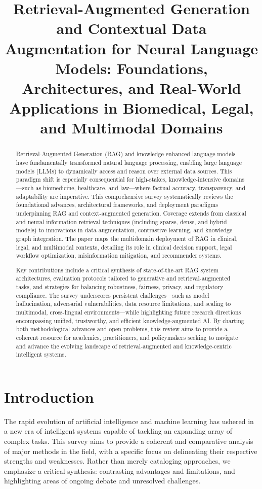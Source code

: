 \documentclass[sigconf]{acmart}
\title{Retrieval-Augmented Generation and Contextual Data Augmentation for Neural Language Models: Foundations, Architectures, and Real-World Applications in Biomedical, Legal, and Multimodal Domains}
\begin{document}
\begin{abstract}
Retrieval-Augmented Generation (RAG) and knowledge-enhanced language models have fundamentally transformed natural language processing, enabling large language models (LLMs) to dynamically access and reason over external data sources. This paradigm shift is especially consequential for high-stakes, knowledge-intensive domains—such as biomedicine, healthcare, and law—where factual accuracy, transparency, and adaptability are imperative. This comprehensive survey systematically reviews the foundational advances, architectural frameworks, and deployment paradigms underpinning RAG and context-augmented generation. Coverage extends from classical and neural information retrieval techniques (including sparse, dense, and hybrid models) to innovations in data augmentation, contrastive learning, and knowledge graph integration. The paper maps the multidomain deployment of RAG in clinical, legal, and multimodal contexts, detailing its role in clinical decision support, legal workflow optimization, misinformation mitigation, and recommender systems.

Key contributions include a critical synthesis of state-of-the-art RAG system architectures, evaluation protocols tailored to generative and retrieval-augmented tasks, and strategies for balancing robustness, fairness, privacy, and regulatory compliance. The survey underscores persistent challenges—such as model hallucination, adversarial vulnerabilities, data resource limitations, and scaling to multimodal, cross-lingual environments—while highlighting future research directions encompassing unified, trustworthy, and efficient knowledge-augmented AI. By charting both methodological advances and open problems, this review aims to provide a coherent resource for academics, practitioners, and policymakers seeking to navigate and advance the evolving landscape of retrieval-augmented and knowledge-centric intelligent systems.
\end{abstract}

\maketitle

\section{Introduction}

The rapid evolution of artificial intelligence and machine learning has ushered in a new era of intelligent systems capable of tackling an expanding array of complex tasks. This survey aims to provide a coherent and comparative analysis of major methods in the field, with a specific focus on delineating their respective strengths and weaknesses. Rather than merely cataloging approaches, we emphasize a critical synthesis: contrasting advantages and limitations, and highlighting areas of ongoing debate and unresolved challenges.
\end{document}

